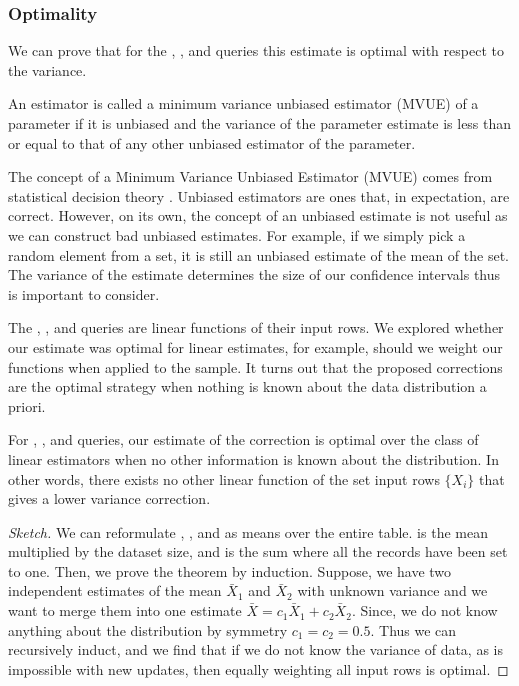 \subsubsection{Optimality}
We can prove that for the \sumfunc, \countfunc, and \avgfunc queries this estimate is optimal with respect to the variance.
\begin{proposition}
An estimator is called a minimum variance unbiased estimator (MVUE) of a parameter if it is unbiased and the variance of the parameter estimate is less than or equal to that of any other unbiased estimator of the parameter.
\end{proposition}
The concept of a Minimum Variance Unbiased Estimator (MVUE) comes from statistical decision theory \cite{cox1979theoretical}.
Unbiased estimators are ones that, in expectation, are correct.
However, on its own, the concept of an unbiased estimate is not useful as we can construct bad unbiased estimates.
For example, if we simply pick a random element from a set, it is still an unbiased estimate of the mean of the set.
The variance of the estimate determines the size of our confidence intervals thus is important to consider.

The \sumfunc, \countfunc, and \avgfunc queries are linear functions of their input rows.
We explored whether our estimate was optimal for linear estimates, for example, should we weight our functions when applied to the sample.
It turns out that the proposed corrections are the optimal strategy when nothing is known about the data distribution a priori.

\begin{theorem}
For \sumfunc, \countfunc, and \avgfunc queries, our estimate of the correction is optimal over the class of linear estimators when no other information is known about the distribution. 
In other words, there exists no other linear function of the set input rows $\{ X_i \}$ that gives a lower variance correction.
\end{theorem}
\begin{proof}[Sketch]
We can reformulate \sumfunc, \countfunc, and \avgfunc as means over the entire table. \sumfunc is the mean multiplied by the dataset size, and \countfunc
is the sum where all the records have been set to one. Then, we prove the theorem by induction. 
Suppose, we have two independent estimates of the mean $\bar{X}_1$ and $\bar{X}_2$ with unknown variance and we want to merge them into one estimate $\bar{X} = c_1\bar{X}_1+c_2\bar{X}_2$.
Since, we do not know anything about the distribution by symmetry $c_1 = c_2 = 0.5$. 
Thus we can recursively induct, and we find that if we do not know the variance of data, as is impossible with new updates, then equally weighting all input rows is optimal. 
\end{proof}
